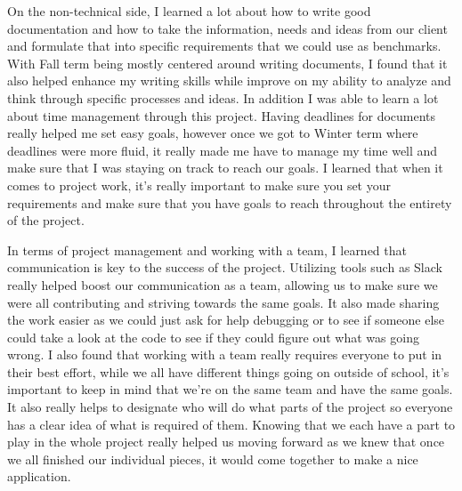 \documentclass[letterpaper,10pt,draftclsnofoot,onecolumn,titlepage]{IEEEtran}
\begin{document}
		On the non-technical side, I learned a lot about how to write good documentation and how to take the information, needs and ideas from our client and formulate that into specific requirements that we could use as benchmarks.
		With Fall term being mostly centered around writing documents, I found that it also helped enhance my writing skills while improve on my ability to analyze and think through specific processes and ideas.
		In addition I was able to learn a lot about time management through this project.
		Having deadlines for documents really helped me set easy goals, however once we got to Winter term where deadlines were more fluid, it really made me have to manage my time well and make sure that I was staying on track to reach our goals.
		I learned that when it comes to project work, it's really important to make sure you set your requirements and make sure that you have goals to reach throughout the entirety of the project.

		In terms of project management and working with a team, I learned that communication is key to the success of the project.
		Utilizing tools such as Slack really helped boost our communication as a team, allowing us to make sure we were all contributing and striving towards the same goals.
		It also made sharing the work easier as we could just ask for help debugging or to see if someone else could take a look at the code to see if they could figure out what was going wrong.
		I also found that working with a team really requires everyone to put in their best effort, while we all have different things going on outside of school, it's important to keep in mind that we're on the same team and have the same goals.
		It also really helps to designate who will do what parts of the project so everyone has a clear idea of what is required of them.
		Knowing that we each have a part to play in the whole project really helped us moving forward as we knew that once we all finished our individual pieces, it would come together to make a nice application.
\end{document}
